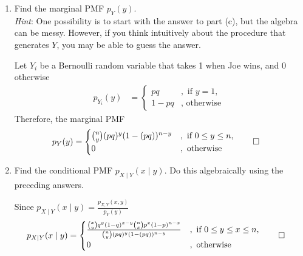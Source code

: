 \documentclass[paper=usletter, fontsize=12pt]{article}
\begin{document}
\begin{enumerate}
\begin{enumerate}
\begin{cproof}
            \end{cproof}

            \item Find the marginal PMF $p_{Y}(y)$. \\ \textit{Hint}: One
            possibility is to start with the answer to part (c), but the
            algebra can be messy. However, if you think intuitively about the
            procedure that generates $Y$, you may be able to guess the answer.
            \begin{cproof}

                Let $Y_i$ be a Bernoulli random variable that takes 1 when Joe wins, and 0 otherwise
                \begin{align*}
                    p_{Y_i}(y) & =
                    \begin{cases}
                        pq &, \text{ if } y = 1,\\
                        1 - pq &, \text{ otherwise }
                    \end{cases}
                \end{align*}
                Therefore, the marginal PMF
                \begin{align*}
                    p_{Y}(y) & =
                    \begin{cases}
                        \binom{n}{y}(pq)^y(1-(pq))^{n-y} &, \text{ if } 0 \le y \le n,\\
                        0 &, \text{ otherwise }
                    \end{cases} \qedhere
                \end{align*}
                \endgroup

            \end{cproof}

            \item Find the conditional PMF $p_{X \mid Y}(x \mid y)$. Do this
            algebraically using the preceding answers.
            \begin{cproof}

                Since $p_{X \mid Y}(x \mid y) = \frac{p_{X, Y}(x, y)}{p_Y(y)}$
                \begin{align*}
                    p_{X \mid Y}(x \mid y) & =
                    \begin{cases}
                        \frac{\binom{x}{y}q^y(1-q)^{x-y}\binom{n}{x}p^x(1-p)^{n-x}}{\binom{n}{y}(pq)^y(1-(pq))^{n-y}} &, \text{ if } 0 \le y \le x \le n,\\
                        0 &, \text{ otherwise }
                    \end{cases} \qedhere
                \end{align*}
                \endgroup


\end{cproof}
\end{enumerate}
\end{enumerate}
\end{document}
